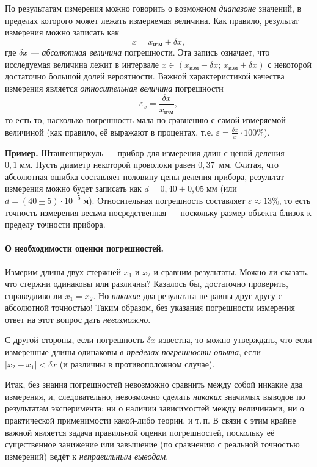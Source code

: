 \documentclass[10pt]{article}
\begin{document}
По результатам измерения можно говорить о возможном \emph{диапазоне}
значений, в пределах которого может лежать измеряемая величина. Как
правило, результат измерения можно записать как
\[
x=x_{\text{изм}}\pm\delta x,
\]
где $\delta x$ --- \emph{абсолютная величина} погрешности.
Эта запись означает, что исследуемая величина лежит в интервале $x\in(x_{\text{изм}}-\delta x;\,x_{\text{изм}}+\delta x)$
с некоторой достаточно большой долей вероятности. Важной характеристикой
качества измерения является \emph{относительная величина} погрешности
\[
\varepsilon_{x}=\frac{\delta x}{x_{\text{изм}}},
\]
то есть то, насколько погрешность мала по сравнению с самой измеряемой
величиной (как правило, её выражают в процентах, т.е. $\varepsilon=\frac{\delta x}{x}\cdot100\%$).

\textbf{\footnotesize{}Пример.}{\footnotesize{} Штангенциркуль ---
прибор для измерения длин с ценой деления $0{,}1\;\text{мм}$. Пусть
диаметр некоторой проволоки равен $0{,}37$~мм. Считая, что абсолютная
ошибка составляет половину цены деления прибора, результат измерения
можно будет записать как $d=0{,}40\pm0{,}05\;\text{мм}$ (или $d=(40\pm5)\cdot10^{-5}\;\text{м}$).
Относительная погрешность составляет $\varepsilon\approx13\%$, то
есть точность измерения весьма посредственная --- поскольку
размер объекта близок к пределу точности прибора.}{\footnotesize\par}

\paragraph{О необходимости оценки погрешностей.}

Измерим длины двух стержней $x_{1}$ и $x_{2}$ и сравним результаты.
Можно ли сказать, что стержни одинаковы или различны? Казалось бы,
достаточно проверить, справедливо ли $x_{1}=x_{2}$. Но \emph{никакие}
два результата не равны друг другу с абсолютной точностью! Таким образом,
без указания погрешности измерения ответ на этот вопрос дать \emph{невозможно}. 

С другой стороны, если погрешность $\delta x$ известна, то можно
утверждать, что если измеренные длины одинаковы \emph{в пределах погрешности
опыта}, если $|x_{2}-x_{1}|<\delta x$ (и различны в противоположном
случае).

Итак, без знания погрешностей невозможно сравнить между собой никакие
два измерения, и, следовательно, невозможно сделать \emph{никаких}
значимых выводов по результатам эксперимента: ни о наличии зависимостей
между величинами, ни о практической применимости какой-либо теории,
и т.\,п. В связи с этим крайне важной является задача правильной
оценки погрешностей, поскольку её существенное занижение или завышение
(по сравнению с реальной точностью измерений) ведёт к \emph{неправильным
выводам}.
\end{document}
